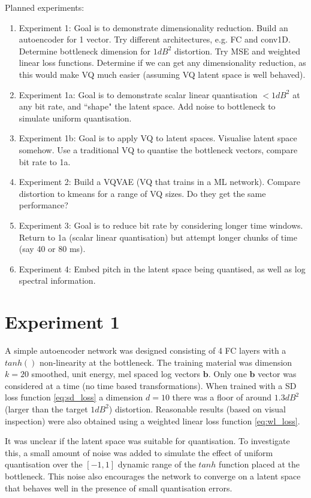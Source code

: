 \documentclass{article}
\begin{document}
Planned experiments:
\begin{enumerate}
\item Experiment 1: Goal is to demonstrate dimensionality reduction.  Build an autoencoder for 1 vector.  Try different architectures, e.g. FC and conv1D.  Determine bottleneck dimension for $1dB^2$ distortion.  Try MSE and weighted linear loss functions. Determine if we can get any dimensionality reduction, as this would make VQ much easier (assuming VQ latent space is well behaved).
\item Experiment 1a: Goal is to demonstrate scalar linear quantisation $< 1dB^2$ at any bit rate, and ``shape" the latent space. Add noise to bottleneck to simulate uniform quantisation.
\item Experiment 1b: Goal is to apply VQ to latent spaces. Visualise latent space somehow. Use a traditional VQ to quantise the bottleneck vectors, compare bit rate to 1a.
\item Experiment 2: Build a VQVAE (VQ that trains in a ML network).  Compare distortion to kmeans for a range of VQ sizes.  Do they get the same performance?
\item Experiment 3: Goal is to reduce bit rate by considering longer time windows.  Return to 1a (scalar linear quantisation) but attempt longer chunks of time (say 40 or 80 ms).
\item Experiment 4: Embed pitch in the latent space being quantised, as well as log spectral information.
\end{enumerate}

\section{Experiment 1}

A simple autoencoder network was designed consisting of 4 FC layers with a $tanh()$ non-linearity at the bottleneck.  The training material was dimension $k=20$ smoothed, unit energy, mel spaced log vectors $\mathbf{b}$.  Only one $\mathbf{b}$ vector was considered at a time (no time based transformations). When trained with a SD loss function \ref{eq:sd_loss} a dimension $d=10$ there was a floor of around $1.3dB^2$ (larger than the target $1 dB^2$) distortion.  Reasonable results (based on visual inspection) were also obtained using a weighted linear loss function \ref{eq:wl_loss}.

It was unclear if the latent space was suitable for quantisation. To investigate this, a small amount of noise was added to simulate the effect of uniform quantisation over the $[-1,1]$ dynamic range of the $tanh$ function placed at the bottleneck.  This noise also encourages the network to converge on a latent space that behaves well in the presence of small quantisation errors.
\end{document}
